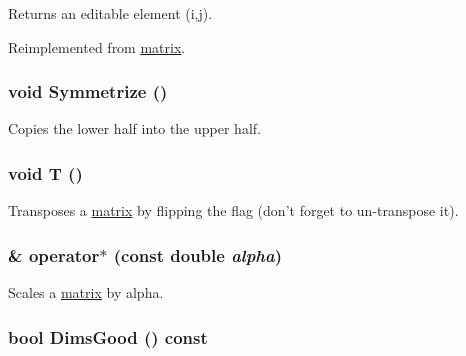 Returns an editable element (i,j). 

Reimplemented from \hyperlink{classJKBuilder_1_1matrix_a3d7fca183ff1c9f4c160218746f2ef31}{matrix}.\hypertarget{classJKBuilder_1_1SymmMatrix_ad1dc6c225dae96f6c5f8f91e5462c645}{
\subsubsection[{Symmetrize}]{\setlength{\rightskip}{0pt plus 5cm}void Symmetrize ()}}
\label{classJKBuilder_1_1SymmMatrix_ad1dc6c225dae96f6c5f8f91e5462c645}


Copies the lower half into the upper half. \hypertarget{classJKBuilder_1_1matrix_af2563817f6505e9f8a6ee5c5c209a115}{
\subsubsection[{T}]{\setlength{\rightskip}{0pt plus 5cm}void T ()}}
\label{classJKBuilder_1_1matrix_af2563817f6505e9f8a6ee5c5c209a115}


Transposes a \hyperlink{classJKBuilder_1_1matrix}{matrix} by flipping the flag (don't forget to un-\/transpose it). \hypertarget{classJKBuilder_1_1matrix_ad4799cbe4a5d07c77f41857a3ce914a2}{
\subsubsection[{operator$\ast$}]{ \& operator$\ast$ (const double {\em alpha})}}
\label{classJKBuilder_1_1matrix_ad4799cbe4a5d07c77f41857a3ce914a2}


Scales a \hyperlink{classJKBuilder_1_1matrix}{matrix} by alpha. \hypertarget{classJKBuilder_1_1tensor_a6e72344440b411f433eb50171648c2d0}{
\subsubsection[{DimsGood}]{\setlength{\rightskip}{0pt plus 5cm}bool DimsGood () const}}
\label{classJKBuilder_1_1tensor_a6e72344440b411f433eb50171648c2d0}


